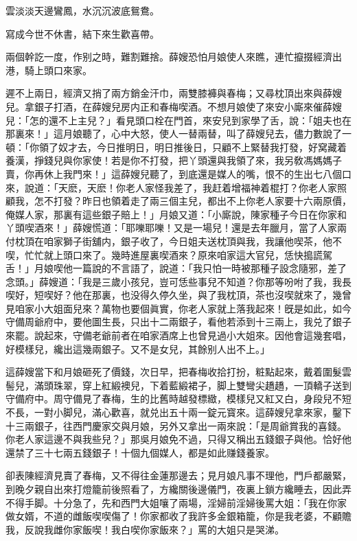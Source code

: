 \begin{myquote}
雲淡淡天邊鸞鳳，水沉沉波底鴛鴦。

寫成今世不休書，結下來生歡喜帶。
\end{myquote}

兩個幹訖一度，作别之時，難割難捨。薛嫂恐怕月娘使人來瞧，連忙攛掇經濟出港，騎上頭口來家。

遲不上兩日，經濟又捎了兩方銷金汗巾，兩雙膝褲與春梅；又尋枕頂出來與薛嫂兒。拿銀子打酒，在薛嫂兒房内正和春梅喫酒。不想月娘使了來安小廝來催薛嫂兒：「怎的還不上主兒？」看見頭口栓在門首，來安兒到家學了舌，說：「姐夫也在那裏來！」這月娘聽了，心中大怒，使人一替兩替，叫了薛嫂兒去，儘力數說了一頓：「你領了奴才去，今日推明日，明日推後日，只顧不上緊替我打發，好窝藏着養漢，掙錢兒與你家使！若是你不打發，把丫頭還與我領了來，我另敎馮媽媽子賣，你再休上我門來！」這薛嫂兒聽了，到底還是媒人的嘴，恨不的生出七八個口來，說道：「天麽，天麽！你老人家怪我差了，我赶着增福神着棍打？你老人家照顧我，怎不打發？昨日也領着走了兩三個主兒，都出不上你老人家要十六兩原價，俺媒人家，那裏有這些銀子賠上！」月娘又道：「小廝說，陳家種子今日在你家和丫頭喫酒來！」薛嫂慌道：「耶嚛耶嚛！又是一場兒！還是去年臘月，當了人家兩付枕頂在咱家獅子街舖内，銀子收了，今日姐夫送枕頂與我，我讓他喫茶，他不喫，忙忙就上頭口來了。幾時進屋裏喫酒來？原來咱家這大官兒，恁快搗謊駕舌！」月娘喫他一篇說的不言語了，說道：「我只怕一時被那種子設念隨邪，差了念頭。」薛嫂道：「我是三歲小孩兒，豈可恁些事兒不知道？你那等吩咐了我，我長喫好，短喫好？他在那裏，也没得久停久坐，與了我枕頂，茶也沒喫就來了，幾曾見咱家小大姐面兒來？萬物也要個眞實，你老人家就上落我起來！旣是如此，如今守備周爺府中，要他圖生長，只出十二兩銀子，看他若添到十三兩上，我兑了銀子來罷。說起來，守備老爺前者在咱家酒席上也曾見過小大姐來。因他會這幾套唱，好模樣兒，纔出這幾兩銀子。又不是女兒，其餘别人出不上。」

這薛嫂當下和月娘砸死了價錢，次日早，把春梅收拾打扮，粧點起來，戴着圍髮雲髻兒，滿頭珠翠，穿上紅緞襖兒，下着藍緞裙子，脚上雙彎尖趫趫，一頂轎子送到守備府中。周守備見了春梅，生的比舊時越發標緻，模樣兒又紅又白，身段兒不短不長，一對小脚兒，滿心歡喜，就兑出五十兩一錠元寳來。這薛嫂兒拿來家，鑿下十三兩銀子，往西門慶家交與月娘，另外又拿出一兩來說：「是周爺賞我的喜錢。你老人家這邊不與我些兒？」那吳月娘免不過，只得又稱出五錢銀子與他。恰好他還禁了三十七兩五錢銀子！十個九個媒人，都是如此赚錢養家。

卻表陳經濟見賣了春梅，又不得往金蓮那邊去；見月娘凡事不理他，門戶都嚴緊，到晚夕親自出來打燈籠前後照看了，方纔關後邊儀門，夜裏上鎖方纔睡去，因此弄不得手脚。十分急了，先和西門大姐嚷了兩場，淫婦前淫婦後罵大姐：「我在你家做女婿，不道的雌飯喫喫傷了！你家都收了我許多金銀箱籠，你是我老婆，不顧贍我，反說我雌你家飯喫！我白喫你家飯來？」罵的大姐只是哭涕。

